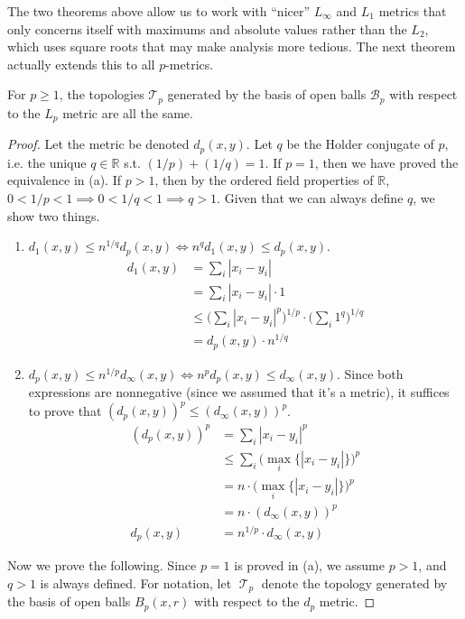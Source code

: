 \documentclass{article}
\DeclareMathOperator{\T}{\mathscr{T}}
\begin{document}
      The two theorems above allow us to work with ``nicer'' $L_\infty$ and $L_1$ metrics that only concerns itself with maximums and absolute values rather than the $L_2$, which uses square roots that may make analysis more tedious. The next theorem actually extends this to all $p$-metrics. 

      \begin{theorem}
        For $p \geq 1$, the topologies $\mathscr{T}_p$ generated by the basis of open balls $\mathscr{B}_p$ with respect to the $L_p$ metric are all the same. 
      \end{theorem}
      \begin{proof}
        Let the metric be denoted $d_p (x, y)$. Let $q$ be the Holder conjugate of $p$, i.e. the unique $q \in \mathbb{R}$ s.t. $(1/p) + (1/q) = 1$. If $p = 1$, then we have proved the equivalence in (a). If $p > 1$, then by the ordered field properties of $\mathbb{R}$, $0 < 1/p < 1 \implies 0 < 1/q < 1 \implies q > 1$. Given that we can always define $q$, we show two things. 
        \begin{enumerate}
          \item $d_1 (x, y) \leq n^{1/q} d_p (x, y) \iff n^q d_1 (x, y) \leq d_p (x, y)$. 
          \begin{align}
            d_1 (x, y) & = \sum_i |x_i - y_i| \\ 
                       & = \sum_i |x_i - y_i| \cdot 1 \\
                       & \leq \bigg( \sum_i |x_i - y_i|^p \bigg)^{1/p} \cdot \bigg(\sum_i 1^q \bigg)^{1/q} \\
                       & = d_p (x, y) \cdot n^{1/q}
          \end{align} 

          \item $d_p (x, y) \leq n^{1/p} d_\infty (x, y) \iff n^p d_p (x, y) \leq d_\infty (x, y)$. Since both expressions are nonnegative (since we assumed that it's a metric), it suffices to prove that $(d_p (x, y))^p \leq (d_\infty (x, y))^{p}$. 
          \begin{align}
            (d_p(x, y))^p & = \sum_i |x_i - y_i|^p \\
                          & \leq \sum_i \big( \max_i \{ |x_i - y_i| \} \big)^p \\
                          & = n \cdot \big( \max_i \{ |x_i - y_i| \} \big)^p \\ 
                          & = n \cdot (d_\infty (x, y))^p \\
            d_p(x, y)     & = n^{1/p} \cdot d_\infty (x, y)
          \end{align}
        \end{enumerate} 
        Now we prove the following. Since $p = 1$ is proved in (a), we assume $p > 1$, and $q > 1$ is always defined. For notation, let $\T_p$ denote the topology generated by the basis of open balls $B_p (x, r)$ with respect to the $d_p$ metric. 


\end{proof}
\end{document}
